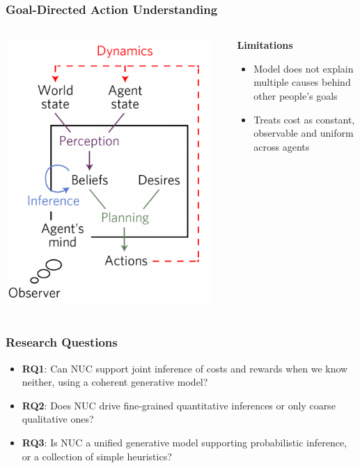 \documentclass{beamer}
\begin{document}
\begin{frame}
\frametitle{Goal-Directed Action Understanding}
\begin{columns}
\begin{column}{0.5\textwidth}
\begin{center}
\includegraphics[width=0.95\textwidth]{goal_directed.png}
\end{center}
\end{column}
\begin{column}{0.5\textwidth}
\textbf{Limitations}
\begin{itemize}
    \item Model does not explain multiple causes behind other people's goals
    \item Treats cost as constant, observable and uniform across agents
\end{itemize}
\end{column}
\end{columns}
\end{frame}

\begin{frame}
\frametitle{Research Questions}
\begin{itemize}
    \item \textbf{RQ1}: Can NUC support joint inference of costs and rewards when we know neither, using a coherent generative model?
    \item \textbf{RQ2}: Does NUC drive fine-grained quantitative inferences or only coarse qualitative ones?
    \item \textbf{RQ3}: Is NUC a unified generative model supporting probabilistic inference, or a collection of simple heuristics?
\end{itemize}
\end{frame}
\end{document}
